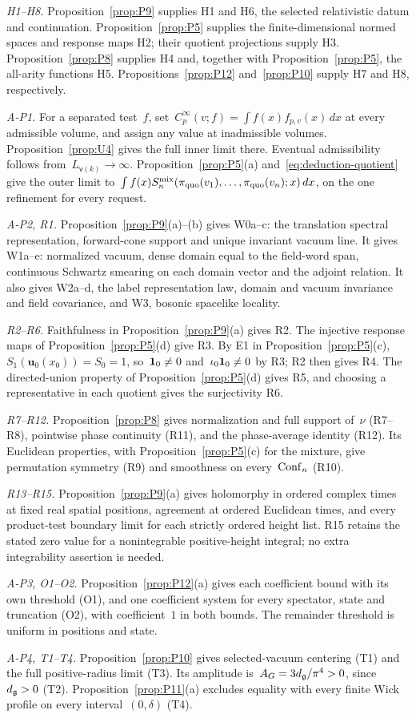 \emph{H1--H8.} Proposition~\ref{prop:P9} supplies H1 and H6, the selected relativistic datum and continuation. Proposition~\ref{prop:P5} supplies the finite-dimensional normed spaces and response maps H2; their quotient projections supply H3. Proposition~\ref{prop:P8} supplies H4 and, together with Proposition~\ref{prop:P5}, the all-arity functions H5. Propositions~\ref{prop:P12} and~\ref{prop:P10} supply H7 and H8, respectively.

\emph{A-P1.} For a separated test~$f$, set~$C_p^\infty(v;f)=\int f(x)f_{p,v}(x)\,dx$ at every admissible volume, and assign any value at inadmissible volumes. Proposition~\ref{prop:U4} gives the full inner limit there. Eventual admissibility follows from~$L_{\mathsf v(k)}\to\infty$. Proposition~\ref{prop:P5}(a) and~\eqref{eq:deduction-quotient} give the outer limit to~$\int f(x)S_n^{\rm mix}(\pi_{\rm quo}(v_1),\ldots,\pi_{\rm quo}(v_n);x)\,dx$, on the one refinement for every request.

\emph{A-P2, R1.} Proposition~\ref{prop:P9}(a)--(b) gives W0a--c: the translation spectral representation, forward-cone support and unique invariant vacuum line. It gives W1a--e: normalized vacuum, dense domain equal to the field-word span, continuous Schwartz smearing on each domain vector and the adjoint relation. It also gives W2a--d, the label representation law, domain and vacuum invariance and field covariance, and W3, bosonic spacelike locality.

\emph{R2--R6.} Faithfulness in Proposition~\ref{prop:P9}(a) gives R2. The injective response maps of Proposition~\ref{prop:P5}(d) give R3. By E1 in Proposition~\ref{prop:P5}(c), $S_1(\mathbf u_0(x_0))=S_0=1$, so~$\mathbf{1}_{0}\ne0$ and~$\iota_0\mathbf{1}_{0}\ne0$ by R3; R2 then gives R4. The directed-union property of Proposition~\ref{prop:P5}(d) gives R5, and choosing a representative in each quotient gives the surjectivity R6.

\emph{R7--R12.} Proposition~\ref{prop:P8} gives normalization and full support of~$\nu$ (R7--R8), pointwise phase continuity (R11), and the phase-average identity (R12). Its Euclidean properties, with Proposition~\ref{prop:P5}(c) for the mixture, give permutation symmetry (R9) and smoothness on every~$\mathrm{Conf}_{n}$ (R10).

\emph{R13--R15.} Proposition~\ref{prop:P9}(a) gives holomorphy in ordered complex times at fixed real spatial positions, agreement at ordered Euclidean times, and every product-test boundary limit for each strictly ordered height list. R15 retains the stated zero value for a nonintegrable positive-height integral; no extra integrability assertion is needed.

\emph{A-P3, O1--O2.} Proposition~\ref{prop:P12}(a) gives each coefficient bound with its own threshold (O1), and one coefficient system for every spectator, state and truncation (O2), with coefficient~$1$ in both bounds. The remainder threshold is uniform in positions and state.

\emph{A-P4, T1--T4.} Proposition~\ref{prop:P10} gives selected-vacuum centering (T1) and the full positive-radius limit (T3). Its amplitude is~$A_G=3d_{\mathfrak{g}}/\pi^4>0$, since~$d_{\mathfrak{g}}>0$ (T2). Proposition~\ref{prop:P11}(a) excludes equality with every finite Wick profile on every interval~$(0,\delta)$ (T4).
